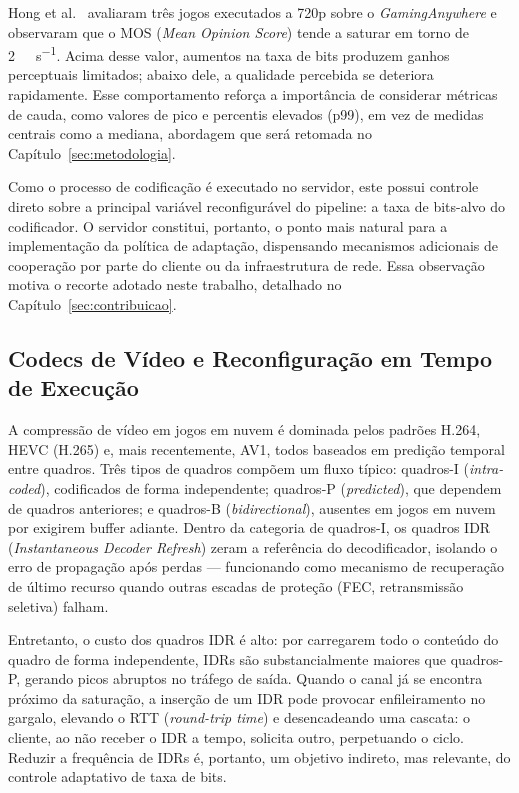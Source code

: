 \documentclass[conference]{IEEEtran}
\begin{document}
Hong et al.~\cite{hong2015} avaliaram três jogos executados a 720p sobre o \emph{GamingAnywhere} e observaram que o MOS (\emph{Mean Opinion Score}) tende a saturar em torno de \SI{2}{\mega\bit\per\second}. Acima desse valor, aumentos na taxa de bits produzem ganhos perceptuais limitados; abaixo dele, a qualidade percebida se deteriora rapidamente. Esse comportamento reforça a importância de considerar métricas de cauda, como valores de pico e percentis elevados (p99), em vez de medidas centrais como a mediana, abordagem que será retomada no Capítulo~\ref{sec:metodologia}.

Como o processo de codificação é executado no servidor, este possui controle direto sobre a principal variável reconfigurável do pipeline: a taxa de bits-alvo do codificador. O servidor constitui, portanto, o ponto mais natural para a implementação da política de adaptação, dispensando mecanismos adicionais de cooperação por parte do cliente ou da infraestrutura de rede. Essa observação motiva o recorte adotado neste trabalho, detalhado no Capítulo~\ref{sec:contribuicao}.


\subsection{Codecs de Vídeo e Reconfiguração em Tempo de Execução}

A compressão de vídeo em jogos em nuvem é dominada pelos padrões
H.264, HEVC (H.265) e, mais recentemente, AV1, todos baseados em
predição temporal entre quadros. Três tipos de quadros compõem
um fluxo típico: quadros-I (\emph{intra-coded}), codificados de
forma independente; quadros-P (\emph{predicted}), que dependem
de quadros anteriores; e quadros-B (\emph{bidirectional}),
ausentes em jogos em nuvem por exigirem buffer adiante. Dentro
da categoria de quadros-I, os quadros IDR (\emph{Instantaneous
Decoder Refresh}) zeram a referência do decodificador, isolando
o erro de propagação após perdas — funcionando como mecanismo de
recuperação de último recurso quando outras escadas de proteção
(FEC, retransmissão seletiva) falham.

Entretanto, o custo dos quadros IDR é alto: por carregarem todo o
conteúdo do quadro de forma independente, IDRs são
substancialmente maiores que quadros-P, gerando picos abruptos
no tráfego de saída. Quando o canal já se encontra próximo da
saturação, a inserção de um IDR pode provocar enfileiramento no
gargalo, elevando o RTT (\emph{round-trip time}) e desencadeando
uma cascata: o cliente, ao não receber o IDR a tempo, solicita
outro, perpetuando o ciclo. Reduzir a frequência de IDRs é,
portanto, um objetivo indireto, mas relevante, do controle
adaptativo de taxa de bits.
\end{document}
